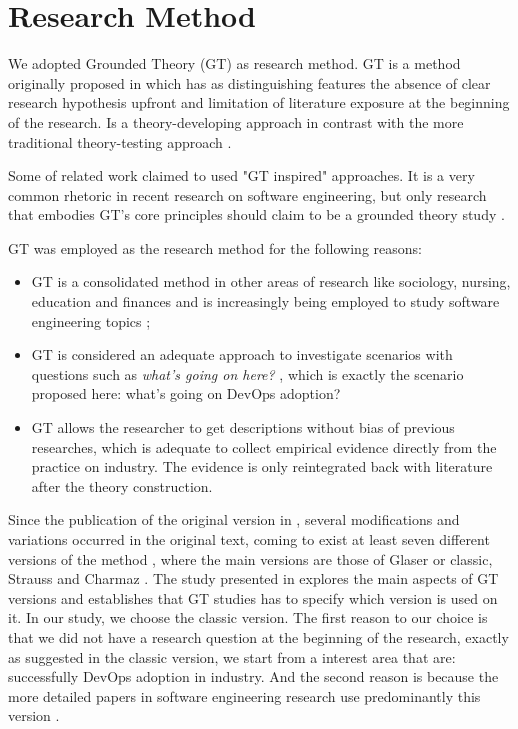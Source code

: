 \section{Research Method}

We adopted Grounded Theory (GT) as research method. GT is a method originally
proposed in \cite{glase1967discovery} which has as distinguishing features the
absence of clear research hypothesis upfront and limitation of literature
exposure at the beginning of the research. Is a theory-developing approach in
contrast with the more traditional theory-testing approach
\cite{coleman2007using}.

Some of related work claimed to used "GT inspired" approaches. It is a very
common rhetoric in recent research on software engineering, but only research
that embodies GT’s core principles should claim to be a grounded theory study
\cite{stol2016grounded}.

GT was employed as the research method for the following reasons:
\begin{itemize}

\item GT is a consolidated method in other areas of research like sociology,
nursing, education and finances and is increasingly being employed
to study software engineering topics \cite{stol2016grounded};

\item GT is considered an adequate approach to investigate scenarios with
questions such as \textit{what's going on here?} \cite{barnsteiner2002using},
which is exactly the scenario proposed here: what's going on DevOps adoption?

\item GT allows the researcher to get descriptions without bias of previous
researches, which is adequate to collect empirical evidence directly from the
practice on industry. The evidence is only reintegrated back with literature
after the theory construction.

\end{itemize}

Since the publication of the original version in \cite{glase1967discovery},
several modifications and variations occurred in the original text, coming to
exist at least seven different versions of the method \cite{denzin2007grounded},
where the main versions are those of Glaser or classic, Strauss and
Charmaz \cite{stol2016grounded}. The study presented in \cite{stol2016grounded}
explores the main aspects of GT versions and establishes that GT studies has to
specify which version is used on it. In our study, we choose the classic
version. The first reason to our choice is that we did not have a research
question at the beginning of the research, exactly as suggested in the classic
version, we start from a interest area that are: successfully DevOps adoption
in industry. And the second reason is because the more detailed papers in
software engineering research use predominantly this version
\cite{stol2016grounded}.

